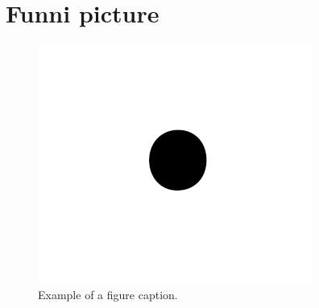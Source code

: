 \documentclass[conference]{IEEEtran}
\begin{document}
\section{Funni picture}

\begin{figure}[htbp]
\centerline{\includegraphics{fig1.png}}
\caption{Example of a figure caption.}
\label{fig}
\end{figure}
\end{document}

